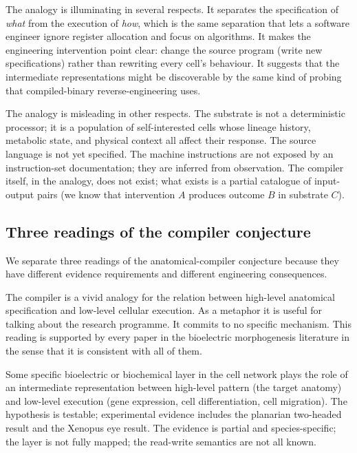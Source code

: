 The analogy is illuminating in several respects. It separates the
specification of \textit{what} from the execution of \textit{how},
which is the same separation that lets a software engineer ignore
register allocation and focus on algorithms. It makes the engineering
intervention point clear: change the source program (write new
specifications) rather than rewriting every cell's behaviour. It
suggests that the intermediate representations might be discoverable
by the same kind of probing that compiled-binary reverse-engineering
uses.

The analogy is misleading in other respects. The substrate is not a
deterministic processor; it is a population of self-interested cells
whose lineage history, metabolic state, and physical context all
affect their response. The source language is not yet specified. The
machine instructions are not exposed by an instruction-set
documentation; they are inferred from observation. The compiler itself,
in the analogy, does not exist; what exists is a partial catalogue of
input-output pairs (we know that intervention $A$ produces outcome $B$
in substrate $C$).

\subsection{Three readings of the compiler conjecture}

We separate three readings of the anatomical-compiler conjecture
because they have different evidence requirements and different
engineering consequences.

 The compiler is a vivid analogy for
the relation between high-level anatomical specification and low-level
cellular execution. As a metaphor it is useful for talking about the
research programme. It commits to no specific mechanism. This reading
is supported by every paper in the bioelectric morphogenesis literature
in the sense that it is consistent with all of them.

 Some specific bioelectric
or biochemical layer in the cell network plays the role of an
intermediate representation between high-level pattern (the target
anatomy) and low-level execution (gene expression, cell
differentiation, cell migration). The hypothesis is testable;
experimental evidence includes the planarian two-headed result and the
Xenopus eye result. The evidence is partial and species-specific; the
layer is not fully mapped; the read-write semantics are not all known.


